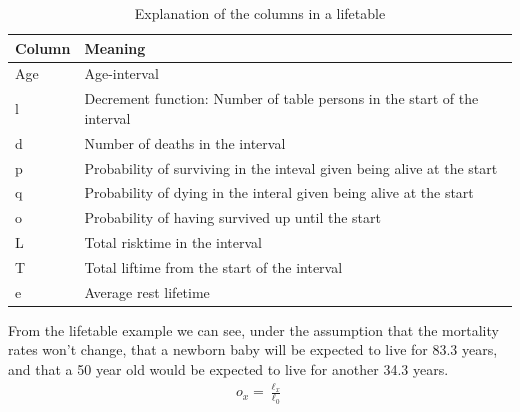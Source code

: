 \documentclass{article}
\begin{document}
\begin{table}[htbp]
\caption{\label{tab:lifetable-columns}Explanation of the columns in a lifetable}
\centering
\begin{tabular}{l|l}
Column & Meaning\\[0pt]
\hline
Age & Age-interval\\[0pt]
l & Decrement function: Number of table persons in the start of the interval\\[0pt]
d & Number of deaths in the interval\\[0pt]
p & Probability of surviving in the inteval given being alive at the start\\[0pt]
q & Probability of dying in the interal given being alive at the start\\[0pt]
o & Probability of having survived up until the start\\[0pt]
L & Total risktime in the interval\\[0pt]
T & Total liftime from the start of the interval\\[0pt]
e & Average rest lifetime\\[0pt]
\end{tabular}
\end{table}

From the lifetable example we can see, under the assumption that the mortality rates won't change, that a newborn baby will be expected to live for 83.3 years, and that a 50 year old would be expected to live for another 34.3 years.
\begin{align*}
o_x= \frac{\ell_{x}}{\ell_0}
\end{align*}
\end{document}
